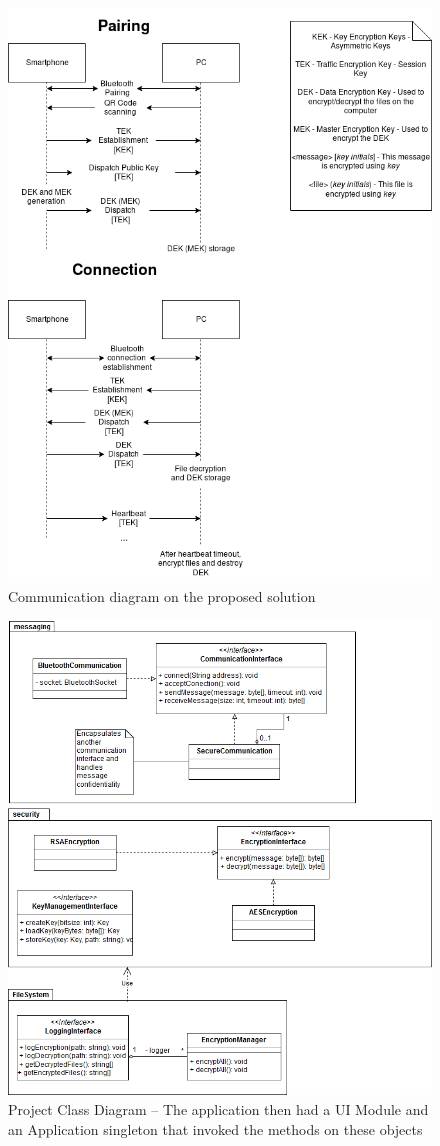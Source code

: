 \documentclass[11,]{article}
\begin{document}
\begin{figure}
\centering
\includegraphics[width=\textwidth,height=1\textwidth]{Solution_Diagram.png}
\caption{Communication diagram on the proposed
solution\label{sol_diagram}}
\end{figure}

\begin{figure}
\centering
\includegraphics[width=\textwidth,height=1\textwidth]{SIRS_Packages.png}
\caption{Project Class Diagram -- The application then had a UI Module
and an Application singleton that invoked the methods on these
objects\label{uml}}
\end{figure}
\end{document}
